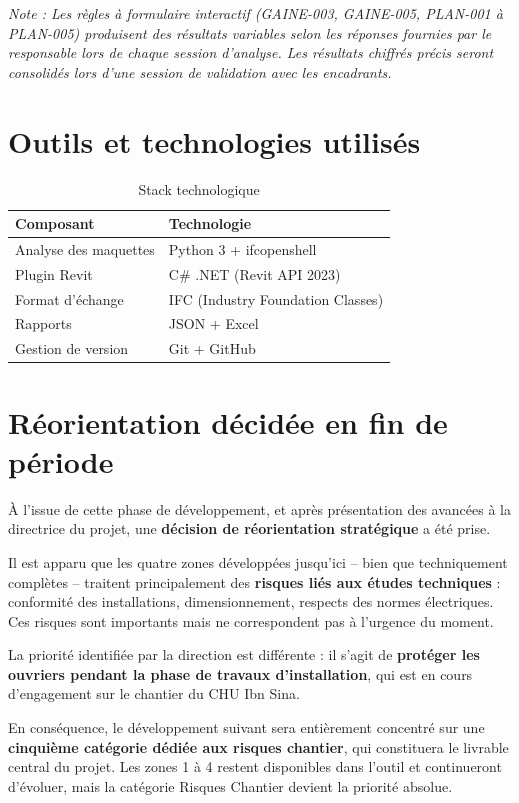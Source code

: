 \documentclass[a4paper,12pt]{article}
\begin{document}
\textit{Note : Les règles à formulaire interactif (GAINE-003, GAINE-005, PLAN-001 à PLAN-005) produisent des résultats variables selon les réponses fournies par le responsable lors de chaque session d'analyse. Les résultats chiffrés précis seront consolidés lors d'une session de validation avec les encadrants.}

\section{Outils et technologies utilisés}

\begin{table}[h!]
\centering
\begin{tabular}{ll}
\toprule
\textbf{Composant} & \textbf{Technologie} \\
\midrule
Analyse des maquettes & Python 3 + ifcopenshell \\
Plugin Revit          & C\# .NET (Revit API 2023) \\
Format d'échange      & IFC (Industry Foundation Classes) \\
Rapports              & JSON + Excel \\
Gestion de version    & Git + GitHub \\
\bottomrule
\end{tabular}
\caption{Stack technologique}
\end{table}

\section{Réorientation décidée en fin de période}

À l'issue de cette phase de développement, et après présentation des avancées à la directrice du projet, une \textbf{décision de réorientation stratégique} a été prise.

Il est apparu que les quatre zones développées jusqu'ici -- bien que techniquement complètes -- traitent principalement des \textbf{risques liés aux études techniques} : conformité des installations, dimensionnement, respects des normes électriques. Ces risques sont importants mais ne correspondent pas à l'urgence du moment.

La priorité identifiée par la direction est différente : il s'agit de \textbf{protéger les ouvriers pendant la phase de travaux d'installation}, qui est en cours d'engagement sur le chantier du CHU Ibn Sina.

En conséquence, le développement suivant sera entièrement concentré sur une \textbf{cinquième catégorie dédiée aux risques chantier}, qui constituera le livrable central du projet. Les zones 1 à 4 restent disponibles dans l'outil et continueront d'évoluer, mais la catégorie Risques Chantier devient la priorité absolue.
\end{document}
